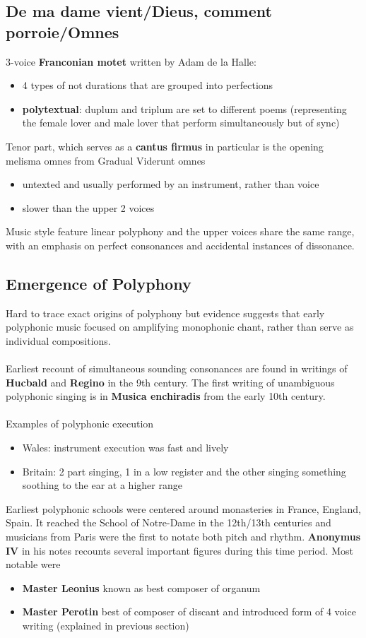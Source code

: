 \documentclass{article}
\begin{document}
  \subsection{De ma dame vient/Dieus, comment porroie/Omnes}
  3-voice \textbf{Franconian motet} written by Adam de la Halle:
  \begin{itemize}
    \item 4 types of not durations that are grouped into perfections
    \item \textbf{polytextual}: duplum and triplum are set to different poems (representing the female lover and male lover that perform simultaneously but of sync) \\
  \end{itemize}
  Tenor part, which serves as a \textbf{cantus firmus} in particular is the opening melisma omnes from Gradual Viderunt omnes
  \begin{itemize}
    \item untexted and usually performed by an instrument, rather than voice
    \item slower than the upper 2 voices
  \end{itemize}
  Music style feature linear polyphony and the upper voices share the same range, with an emphasis on perfect consonances and accidental instances of dissonance.
  \subsection{Emergence of Polyphony}
  Hard to trace exact origins of polyphony but evidence suggests that early polyphonic music focused on amplifying monophonic chant, rather than serve as individual compositions. \\ \\
  Earliest recount of simultaneous sounding consonances are found in writings of \textbf{Hucbald} and \textbf{Regino} in the 9th century. The first writing of unambiguous polyphonic singing is in \textbf{Musica enchiradis} from the early 10th century. \\ \\
  Examples of polyphonic execution
  \begin{itemize}
    \item Wales: instrument execution was fast and lively 
    \item Britain: 2 part singing, 1 in a low register and the other singing something soothing to the ear at a higher range
  \end{itemize}
  Earliest polyphonic schools were centered around monasteries in France, England, Spain. It reached the School of Notre-Dame in the 12th/13th centuries and musicians from Paris were the first to notate both pitch and rhythm. \textbf{Anonymus IV} in his notes recounts several important figures during this time period. Most notable were
  \begin{itemize}
    \item \textbf{Master Leonius} known as best composer of organum
    \item \textbf{Master Perotin} best of composer of discant and introduced form of 4 voice writing (explained in previous section)
  \end{itemize}
 
\end{document}
